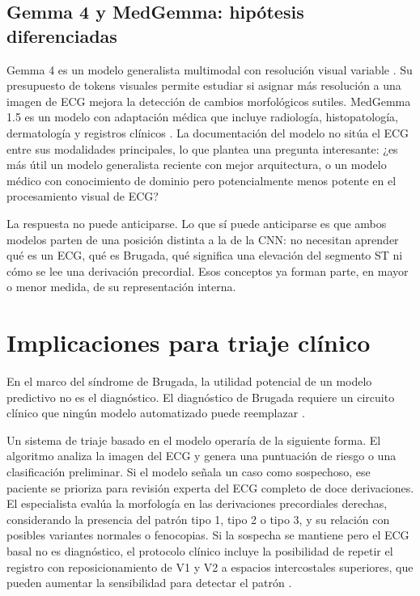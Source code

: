 \subsection{Gemma 4 y MedGemma: hipótesis diferenciadas}

Gemma 4 es un modelo generalista multimodal con resolución visual variable \cite{gemma4card}. Su presupuesto de tokens visuales permite estudiar si asignar más resolución a una imagen de ECG mejora la detección de cambios morfológicos sutiles. MedGemma 1.5 es un modelo con adaptación médica que incluye radiología, histopatología, dermatología y registros clínicos \cite{medgemma15}. La documentación del modelo no sitúa el ECG entre sus modalidades principales, lo que plantea una pregunta interesante: ¿es más útil un modelo generalista reciente con mejor arquitectura, o un modelo médico con conocimiento de dominio pero potencialmente menos potente en el procesamiento visual de ECG?

La respuesta no puede anticiparse. Lo que sí puede anticiparse es que ambos modelos parten de una posición distinta a la de la CNN: no necesitan aprender qué es un ECG, qué es Brugada, qué significa una elevación del segmento ST ni cómo se lee una derivación precordial. Esos conceptos ya forman parte, en mayor o menor medida, de su representación interna.

\section{Implicaciones para triaje clínico}

En el marco del síndrome de Brugada, la utilidad potencial de un modelo predictivo no es el diagnóstico. El diagnóstico de Brugada requiere un circuito clínico que ningún modelo automatizado puede reemplazar \cite{wilde2023scbt}.

Un sistema de triaje basado en el modelo operaría de la siguiente forma. El algoritmo analiza la imagen del ECG y genera una puntuación de riesgo o una clasificación preliminar. Si el modelo señala un caso como sospechoso, ese paciente se prioriza para revisión experta del ECG completo de doce derivaciones. El especialista evalúa la morfología en las derivaciones precordiales derechas, considerando la presencia del patrón tipo 1, tipo 2 o tipo 3, y su relación con posibles variantes normales o fenocopias. Si la sospecha se mantiene pero el ECG basal no es diagnóstico, el protocolo clínico incluye la posibilidad de repetir el registro con reposicionamiento de V1 y V2 a espacios intercostales superiores, que pueden aumentar la sensibilidad para detectar el patrón \cite{brugadadrugsdiagnostic}.

